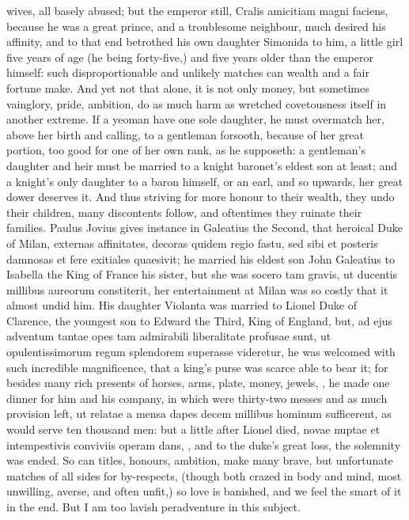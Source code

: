 wives, all basely abused; but the emperor still, Cralis amicitiam magni
faciens, because he was a great prince, and a troublesome neighbour,
much desired his affinity, and to that end betrothed his own daughter
Simonida to him, a little girl five years of age (he being forty-five,)
and five years older than the emperor himself: such
disproportionable and unlikely matches can wealth and a fair fortune
make. And yet not that alone, it is not only money, but sometimes
vainglory, pride, ambition, do as much harm as wretched covetousness
itself in another extreme. If a yeoman have one sole daughter, he must
overmatch her, above her birth and calling, to a gentleman forsooth,
because of her great portion, too good for one of her own rank, as he
supposeth: a gentleman's daughter and heir must be married to a knight
baronet's eldest son at least; and a knight's only daughter to a baron
himself, or an earl, and so upwards, her great dower deserves it. And
thus striving for more honour to their wealth, they undo their
children, many discontents follow, and oftentimes they ruinate their
families. Paulus Jovius gives instance in Galeatius the Second,
that heroical Duke of Milan, externas affinitates, decoras quidem regio
fastu, sed sibi et posteris damnosas et fere exitiales quaesivit; he
married his eldest son John Galeatius to Isabella the King of France
his sister, but she was socero tam gravis, ut ducentis millibus
aureorum constiterit, her entertainment at Milan was so costly that it
almost undid him. His daughter Violanta was married to Lionel Duke of
Clarence, the youngest son to Edward the Third, King of England, but,
ad ejus adventum tantae opes tam admirabili liberalitate profusae sunt,
ut opulentissimorum regum splendorem superasse videretur, he was
welcomed with such incredible magnificence, that a king's purse was
scarce able to bear it; for besides many rich presents of horses, arms,
plate, money, jewels, \etc{}, he made one dinner for him and his company,
in which were thirty-two messes and as much provision left, ut relatae
a mensa dapes decem millibus hominum sufficerent, as would serve ten
thousand men: but a little after Lionel died, novae nuptae et
intempestivis conviviis operam dans, \etc{}, and to the duke's great loss,
the solemnity was ended. So can titles, honours, ambition, make many
brave, but unfortunate matches of all sides for by-respects, (though
both crazed in body and mind, most unwilling, averse, and often unfit,)
so love is banished, and we feel the smart of it in the end. But I am
too lavish peradventure in this subject.

